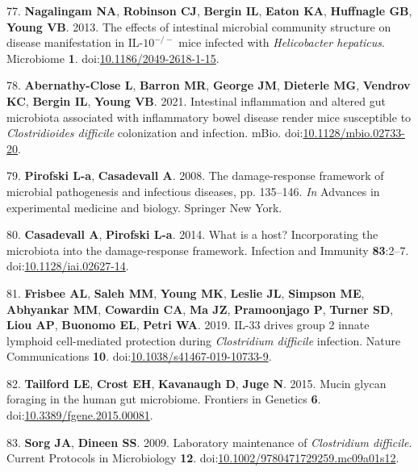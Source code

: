 \documentclass[
  12pt,
]{article}
\newenvironment{cslreferences}%
  {}%
  {\par}
\begin{document}
\begin{cslreferences}
\leavevmode\hypertarget{ref-Nagalingam2013}{}%
77. \textbf{Nagalingam NA}, \textbf{Robinson CJ}, \textbf{Bergin IL},
\textbf{Eaton KA}, \textbf{Huffnagle GB}, \textbf{Young VB}. 2013. The
effects of intestinal microbial community structure on disease
manifestation in IL-\(10^{-/-}\) mice infected with \emph{Helicobacter
hepaticus}. Microbiome \textbf{1}.
doi:\href{https://doi.org/10.1186/2049-2618-1-15}{10.1186/2049-2618-1-15}.

\leavevmode\hypertarget{ref-AbernathyClose2021}{}%
78. \textbf{Abernathy-Close L}, \textbf{Barron MR}, \textbf{George JM},
\textbf{Dieterle MG}, \textbf{Vendrov KC}, \textbf{Bergin IL},
\textbf{Young VB}. 2021. Intestinal inflammation and altered gut
microbiota associated with inflammatory bowel disease render mice
susceptible to \emph{Clostridioides difficile} colonization and
infection. mBio.
doi:\href{https://doi.org/10.1128/mbio.02733-20}{10.1128/mbio.02733-20}.

\leavevmode\hypertarget{ref-Pirofski2008}{}%
79. \textbf{Pirofski L-a}, \textbf{Casadevall A}. 2008. The
damage-response framework of microbial pathogenesis and infectious
diseases, pp. 135--146. \emph{In} Advances in experimental medicine and
biology. Springer New York.

\leavevmode\hypertarget{ref-Casadevall2014}{}%
80. \textbf{Casadevall A}, \textbf{Pirofski L-a}. 2014. What is a host?
Incorporating the microbiota into the damage-response framework.
Infection and Immunity \textbf{83}:2--7.
doi:\href{https://doi.org/10.1128/iai.02627-14}{10.1128/iai.02627-14}.

\leavevmode\hypertarget{ref-Frisbee2019}{}%
81. \textbf{Frisbee AL}, \textbf{Saleh MM}, \textbf{Young MK},
\textbf{Leslie JL}, \textbf{Simpson ME}, \textbf{Abhyankar MM},
\textbf{Cowardin CA}, \textbf{Ma JZ}, \textbf{Pramoonjago P},
\textbf{Turner SD}, \textbf{Liou AP}, \textbf{Buonomo EL}, \textbf{Petri
WA}. 2019. IL-33 drives group 2 innate lymphoid cell-mediated protection
during \emph{Clostridium difficile} infection. Nature Communications
\textbf{10}.
doi:\href{https://doi.org/10.1038/s41467-019-10733-9}{10.1038/s41467-019-10733-9}.

\leavevmode\hypertarget{ref-Tailford2015}{}%
82. \textbf{Tailford LE}, \textbf{Crost EH}, \textbf{Kavanaugh D},
\textbf{Juge N}. 2015. Mucin glycan foraging in the human gut
microbiome. Frontiers in Genetics \textbf{6}.
doi:\href{https://doi.org/10.3389/fgene.2015.00081}{10.3389/fgene.2015.00081}.

\leavevmode\hypertarget{ref-Sorg2009}{}%
83. \textbf{Sorg JA}, \textbf{Dineen SS}. 2009. Laboratory maintenance
of \emph{Clostridium difficile}. Current Protocols in Microbiology
\textbf{12}.
doi:\href{https://doi.org/10.1002/9780471729259.mc09a01s12}{10.1002/9780471729259.mc09a01s12}.


\end{cslreferences}
\end{document}
